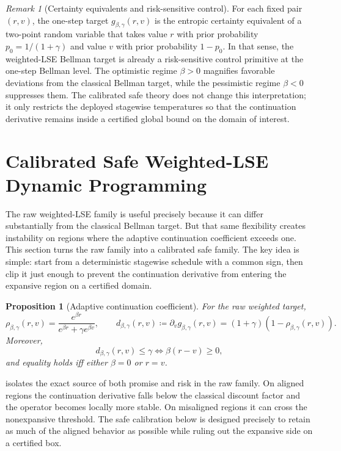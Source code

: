 \documentclass{article}
\newtheorem{proposition}[proposition]{Proposition}
\theoremstyle{remark}
\newtheorem{remark}[remark]{Remark}
\newcommand{\defeq}{\coloneqq}
\newcommand{\gbg}{g_{\beta,\gamma}}
\begin{document}
\begin{remark}[Certainty equivalents and risk-sensitive control]
\label{rem:certainty-equivalent}
For each fixed pair $(r,v)$, the one-step target $g_{\beta,\gamma}(r,v)$ is the entropic certainty equivalent of a two-point random variable that takes value $r$ with prior probability $p_0=1/(1+\gamma)$ and value $v$ with prior probability $1-p_0$.
In that sense, the weighted-LSE Bellman target is already a risk-sensitive control primitive at the one-step Bellman level.
The optimistic regime $\beta>0$ magnifies favorable deviations from the classical Bellman target, while the pessimistic regime $\beta<0$ suppresses them.
The calibrated safe theory does not change this interpretation; it only restricts the deployed stagewise temperatures so that the continuation derivative remains inside a certified global bound on the domain of interest.
\end{remark}

\section{Calibrated Safe Weighted-LSE Dynamic Programming}
\label{sec:safe}

The raw weighted-LSE family is useful precisely because it can differ substantially from the classical Bellman target.
But that same flexibility creates instability on regions where the adaptive continuation coefficient exceeds one.
This section turns the raw family into a calibrated safe family.
The key idea is simple: start from a deterministic stagewise schedule with a common sign, then clip it just enough to prevent the continuation derivative from entering the expansive region on a certified domain.

\begin{proposition}[Adaptive continuation coefficient]
\label{prop:effective-discount}
For the raw weighted target,
\[
\rho_{\beta,\gamma}(r,v)=\frac{e^{\beta r}}{e^{\beta r}+\gamma e^{\beta v}},
\qquad
d_{\beta,\gamma}(r,v) \defeq \partial_v \gbg(r,v) = (1+\gamma)(1-\rho_{\beta,\gamma}(r,v)).
\]
Moreover,
\begin{equation}
d_{\beta,\gamma}(r,v) \le \gamma
\iff
\beta(r-v)\ge 0,
\label{eq:discount-comparison}
\end{equation}
and equality holds iff either $\beta=0$ or $r=v$.
\end{proposition}

 isolates the exact source of both promise and risk in the raw family.
On aligned regions the continuation derivative falls below the classical discount factor and the operator becomes locally more stable.
On misaligned regions it can cross the nonexpansive threshold.
The safe calibration below is designed precisely to retain as much of the aligned behavior as possible while ruling out the expansive side on a certified box.
\end{document}
